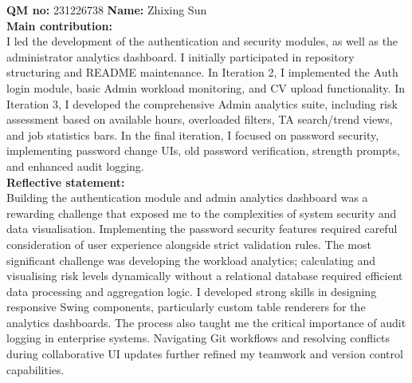 \documentclass[12pt, a4paper]{article}
\begin{document}
\vspace{1.5em}
\textbf{QM no:} 231226738 \hspace{2em} \textbf{Name:} Zhixing Sun\\
\textbf{Main contribution:}\\
I led the development of the authentication and security modules, as well as the administrator analytics dashboard. I initially participated in repository structuring and README maintenance. In Iteration 2, I implemented the Auth login module, basic Admin workload monitoring, and CV upload functionality. In Iteration 3, I developed the comprehensive Admin analytics suite, including risk assessment based on available hours, overloaded filters, TA search/trend views, and job statistics bars. In the final iteration, I focused on password security, implementing password change UIs, old password verification, strength prompts, and enhanced audit logging.\\
\textbf{Reflective statement:}\\
Building the authentication module and admin analytics dashboard was a rewarding challenge that exposed me to the complexities of system security and data visualisation. Implementing the password security features required careful consideration of user experience alongside strict validation rules. The most significant challenge was developing the workload analytics; calculating and visualising risk levels dynamically without a relational database required efficient data processing and aggregation logic. I developed strong skills in designing responsive Swing components, particularly custom table renderers for the analytics dashboards. The process also taught me the critical importance of audit logging in enterprise systems. Navigating Git workflows and resolving conflicts during collaborative UI updates further refined my teamwork and version control capabilities.
\end{document}
